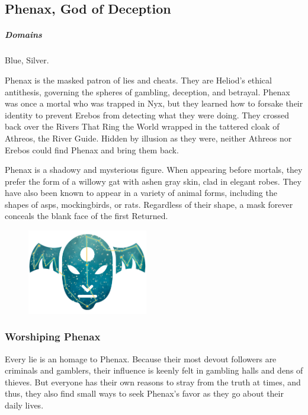 \subsection*{Phenax, God of Deception} \label{ssec::phenax}
    \subparagraph{Domains} Blue, Silver.

    Phenax is the masked patron of lies and cheats.
    They are Heliod's ethical antithesis, governing the spheres of gambling, deception, and betrayal.
    Phenax was once a mortal who was trapped in Nyx, but they learned how to forsake their identity to prevent Erebos from detecting what they were doing.
    They crossed back over the Rivers That Ring the World wrapped in the tattered cloak of Athreos, the River Guide.
    Hidden by illusion as they were, neither Athreos nor Erebos could find Phenax and bring them back.


    Phenax is a shadowy and mysterious figure.
    When appearing before mortals, they prefer the form of a willowy gat with ashen gray skin, clad in elegant robes.
    They have also been known to appear in a variety of animal forms, including the shapes of asps, mockingbirds, or rats.
    Regardless of their shape, a mask forever conceals the blank face of the first Returned.

    \begin{figure}[t]
        \centering
        \includegraphics[width=0.47\textwidth]{02viphoger/img/10s_phenax.png}
    \end{figure}

    \subsubsection{Worshiping Phenax}
        Every lie is an homage to Phenax.
        Because their most devout followers are criminals and gamblers, their influence is keenly felt in gambling halls and dens of thieves.
        But everyone has their own reasons to stray from the truth at times, and thus, they also find small ways to seek Phenax's favor as they go about their daily lives.

